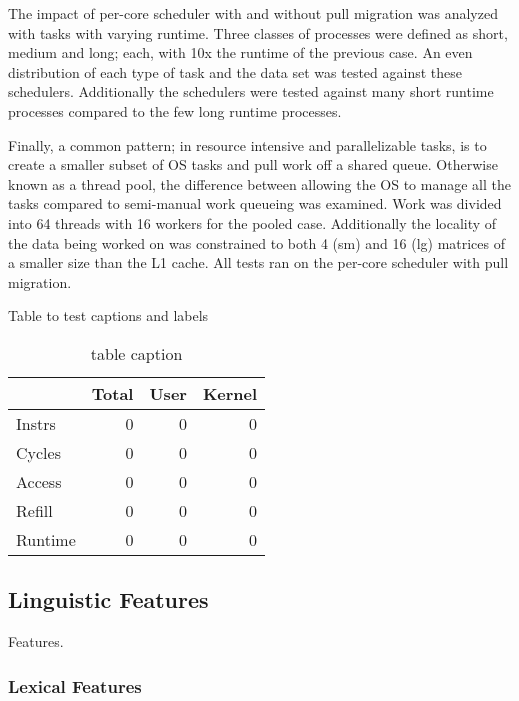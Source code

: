 \documentclass{cys}
\begin{document}
The impact of per-core scheduler with and without pull migration was analyzed with tasks with varying runtime.  Three classes of processes were defined as short, medium and long; each, with 10x the runtime of the previous case.  An even distribution of each type of task and the data set was tested against these schedulers.  Additionally the schedulers were tested against many short runtime processes compared to the few long runtime processes.

Finally, a common pattern; in resource intensive and parallelizable tasks, is to create a smaller subset of OS tasks and pull work off a shared queue.  Otherwise known as a thread pool, the difference between allowing the OS to manage all the tasks compared to semi-manual work queueing was examined.  Work was divided into 64 threads with 16 workers for the pooled case.  Additionally the locality of the data being worked on was constrained to both 4 (sm) and 16 (lg) matrices of a smaller size than the L1 cache.  All tests ran on the per-core scheduler with pull migration.  

\begin{table}[h!]
    \centering
    \caption{Table to test captions and labels}
\end{table}

\begin{table}[h!]
    \centering
    \begin{tabular}{ l|rrr }
        & Total & User & Kernel \\
        \hline
        Instrs & 0 & 0 & 0 \\
        Cycles & 0 & 0 & 0 \\
        Access & 0 & 0 & 0 \\
        Refill & 0 & 0 & 0 \\
        Runtime & 0 & 0 & 0 \\
        \hline
    \end{tabular}
    \caption{table caption}        
\end{table}

\subsection{Linguistic Features}
\label{subsection:linguistic}

Features. 

\subsubsection{Lexical Features}
\label{subsection:lexicalFeatures}
\end{document}
